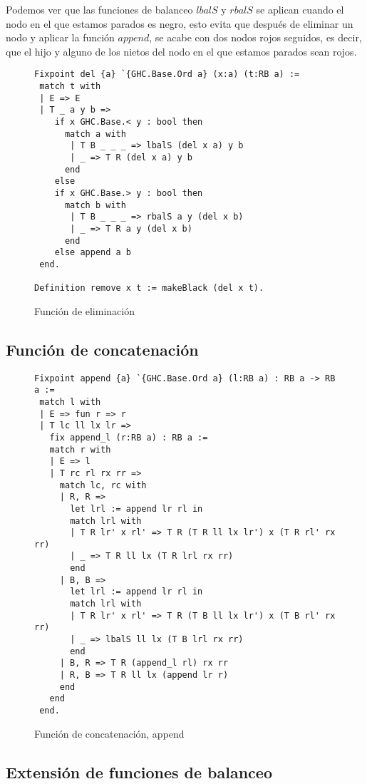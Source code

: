 \documentclass[letterpaper,12pt,oneside]{book}
\theoremstyle{plain}
\theoremstyle{definition}
\theoremstyle{remark}
\begin{document}
Podemos ver que las funciones de balanceo $lbalS$ y $rbalS$ se aplican cuando el nodo en el que estamos 
parados es negro, esto evita que después de eliminar un nodo y aplicar la funci\'on $append$, se acabe 
con dos nodos rojos seguidos, es decir, que el hijo y alguno de los nietos del nodo en el que estamos 
parados sean rojos.  

\begin{figure}
\centering 
\captionsetup{justification=centering}
\begin{verbatim}
Fixpoint del {a} `{GHC.Base.Ord a} (x:a) (t:RB a) :=
 match t with
 | E => E
 | T _ a y b =>
    if x GHC.Base.< y : bool then 
      match a with
       | T B _ _ _ => lbalS (del x a) y b
       | _ => T R (del x a) y b
      end
    else 
    if x GHC.Base.> y : bool then 
      match b with
       | T B _ _ _ => rbalS a y (del x b)
       | _ => T R a y (del x b)
      end
    else append a b
 end.

Definition remove x t := makeBlack (del x t).
\end{verbatim}
\caption{Función de eliminación}
\end{figure}

\subsection{Funci\'on de concatenaci\'on}

\begin{figure}
\centering 
\captionsetup{justification=centering}
\begin{verbatim}
Fixpoint append {a} `{GHC.Base.Ord a} (l:RB a) : RB a -> RB a :=
 match l with
 | E => fun r => r
 | T lc ll lx lr =>
   fix append_l (r:RB a) : RB a :=
   match r with
   | E => l
   | T rc rl rx rr =>
     match lc, rc with
     | R, R =>
       let lrl := append lr rl in
       match lrl with
       | T R lr' x rl' => T R (T R ll lx lr') x (T R rl' rx rr)
       | _ => T R ll lx (T R lrl rx rr)
       end
     | B, B =>
       let lrl := append lr rl in
       match lrl with
       | T R lr' x rl' => T R (T B ll lx lr') x (T B rl' rx rr)
       | _ => lbalS ll lx (T B lrl rx rr)
       end
     | B, R => T R (append_l rl) rx rr
     | R, B => T R ll lx (append lr r)
     end
   end
 end.
\end{verbatim}
\caption{Funci\'on de concatenaci\'on, append}
\end{figure}

\subsection{Extensi\'on de funciones de balanceo}
\end{document}
